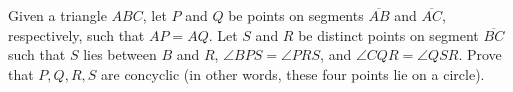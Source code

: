 Given a triangle $ABC$, let $P$ and $Q$ be points on segments $\overline{AB}$ and $\overline{AC}$, respectively, such that $AP=AQ$. Let $S$ and $R$ be distinct points on segment $\overline{BC}$ such that $S$ lies between $B$ and $R$, $\angle BPS=\angle PRS$, and $\angle CQR=\angle QSR$. Prove that $P,Q,R,S$ are concyclic (in other words, these four points lie on a circle).